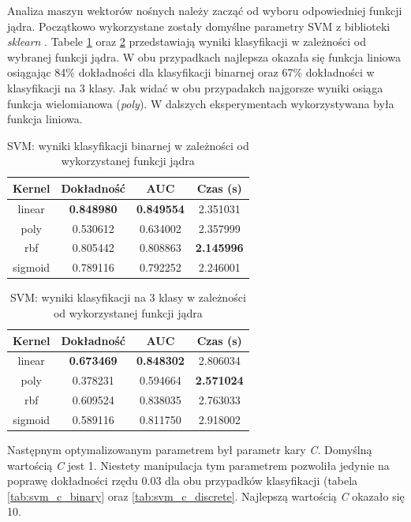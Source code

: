 \documentclass[a4paper, twoside, 11pt, openright]{article}
\begin{document}
Analiza maszyn wektorów nośnych należy zacząć od wyboru odpowiedniej funkcji jądra. Początkowo wykorzystane zostały domyślne parametry SVM z biblioteki \textit{sklearn} \cite{bib:sklearnsvm}. Tabele \ref{tab:svm_kernel_binary} oraz \ref{tab:svm_kernel_discrete} przedstawiają wyniki klasyfikacji w zależności od wybranej funkcji jądra. W obu przypadkach najlepsza okazała się funkcja liniowa osiągając 84\% dokładności dla klasyfikacji binarnej oraz 67\% dokładności w klasyfikacji na 3 klasy.
 Jak widać w obu przypadakch najgorsze wyniki osiąga funkcja wielomianowa (\textit{poly}). 
W dalszych eksperymentach wykorzystywana była funkcja liniowa.
\begin{table}[H]
    \centering
    \begin{tabular}{|c|c|c|c|}
    \hline
        \textbf{Kernel} & \textbf{Dokładność} & \textbf{AUC} & \textbf{Czas (s)} \\ \hline
linear  &  \textbf{0.848980} &  \textbf{0.849554} &    2.351031 \\ \hline
poly    &  0.530612 &  0.634002 &    2.357999 \\ \hline
rbf     &  0.805442 &  0.808863 &    \textbf{2.145996} \\ \hline
sigmoid &  0.789116 &  0.792252 &    2.246001 \\ \hline
    \end{tabular}
    \caption{SVM: wyniki klasyfikacji binarnej w zależności od wykorzystanej funkcji jądra}
    \label{tab:svm_kernel_binary}
\end{table}

\begin{table}[H]
    \centering
    \begin{tabular}{|c|c|c|c|}
    \hline
        \textbf{Kernel} & \textbf{Dokładność} & \textbf{AUC} & \textbf{Czas (s)} \\ \hline
linear  &  \textbf{0.673469} &  \textbf{0.848302} &    2.806034 \\ \hline
poly    &  0.378231 &  0.594664 &    \textbf{2.571024} \\ \hline
rbf     &  0.609524 &  0.838035 &    2.763033 \\ \hline
sigmoid &  0.589116 &  0.811750 &    2.918002 \\ \hline
    \end{tabular}
    \caption{SVM: wyniki klasyfikacji na 3 klasy w zależności od wykorzystanej funkcji jądra}
    \label{tab:svm_kernel_discrete}
\end{table}

Następnym optymalizowanym parametrem był parametr kary \textit{C}. Domyślną wartością \textit{C} jest 1. Niestety manipulacja tym parametrem pozwoliła jedynie na poprawę dokładności rzędu $0.03$ dla obu przypadków klasyfikacji (tabela \ref{tab:svm_c_binary} oraz \ref{tab:svm_c_discrete}. Najlepszą wartością \textit{C} okazało się 10. 
\end{document}
